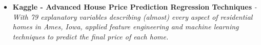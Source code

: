 \documentclass{article}
\begin{document}
\begin{itemize}
    \item{\textbf{\large{Kaggle - Advanced House Price Prediction Regression Techniques}}}
          \newline
          \textit{-With 79 explanatory variables describing (almost) every aspect of residential homes in Ames, Iowa, applied feature engineering and machine learning techniques to predict the final price of each home.}
\end{itemize}




\end{document}
